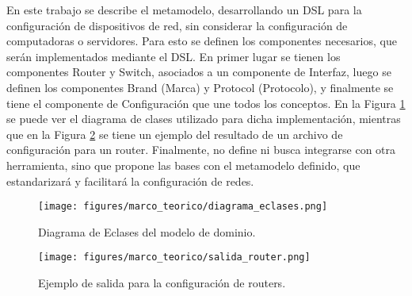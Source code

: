 En este trabajo se describe el metamodelo, desarrollando un DSL para la configuración de dispositivos de red, sin considerar la configuración de computadoras o servidores. Para esto se definen los componentes necesarios, que serán implementados mediante el DSL. En primer lugar se tienen los componentes Router y Switch, asociados a un componente de Interfaz, luego se definen los componentes Brand (Marca) y Protocol (Protocolo), y finalmente se tiene el componente de Configuración que une todos los conceptos.  En la Figura \ref{fig:marco:eclassdiagram} se puede ver el diagrama de clases utilizado para dicha implementación, mientras que en la Figura \ref{fig:marco:routerconfigurationexample} se tiene un ejemplo del resultado de un archivo de configuración para un router.
Finalmente, no define ni busca integrarse con otra herramienta, sino que propone las bases con el metamodelo definido, que estandarizará y facilitará la configuración de redes. \cite{higuerametamodelo}

\begin{figure}[htbp]
    \centering
    \texttt{[image: figures/marco\_teorico/diagrama\_eclases.png]}
    \caption{Diagrama de Eclases del modelo de dominio. \cite{higuerametamodelo}}
    \label{fig:marco:eclassdiagram}
\end{figure}

\begin{figure}[htbp]
    \centering
    \texttt{[image: figures/marco\_teorico/salida\_router.png]}
    \caption{Ejemplo de salida para la configuración de routers. \cite{higuerametamodelo}}
    \label{fig:marco:routerconfigurationexample}
\end{figure}


